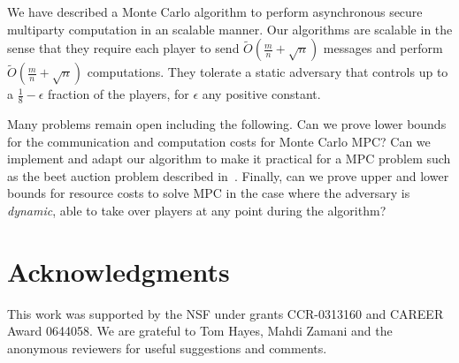 \documentclass[10pt]{llncs}
\newcommand{\fbad}{\frac18\xspace}
\begin{document}
We have described a Monte Carlo algorithm to perform asynchronous
secure multiparty computation in an scalable manner.  Our algorithms
are scalable in the sense that they require each player to send
$\tilde{O}(\frac{m}{n} + \sqrt n)$ messages and perform
$\tilde{O}(\frac{m}{n} + \sqrt n)$ computations.  They tolerate a
static adversary that controls up to a $\fbad-\epsilon$ fraction of
the players, for $\epsilon$ any positive constant.

Many problems remain open including the following. Can we prove lower
bounds for the communication and computation costs for Monte Carlo
MPC?  Can we implement and adapt our algorithm to make it practical
for a MPC problem such as the beet auction problem described
in~\cite{bogetoft2009secure}.  Finally, can we prove upper and lower
bounds for resource costs to solve MPC in the case where the adversary
is \emph{dynamic}, able to take over players at any point during the
algorithm?

\section{Acknowledgments}

This work was supported by the NSF under grants CCR-0313160 and CAREER Award 
0644058. We are grateful to Tom Hayes, Mahdi Zamani and the anonymous 
reviewers for useful suggestions and comments.






\end{document}
